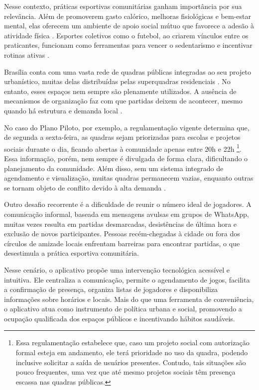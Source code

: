 Nesse contexto, práticas esportivas comunitárias ganham importância por sua relevância. Além de promoverem gasto calórico, melhoras fisiológicas e bem-estar mental, elas oferecem um ambiente de apoio social mútuo que favorece a adesão à atividade física \cite{ministerio2023}. Esportes coletivos como o futebol, ao criarem vínculos entre os praticantes, funcionam como ferramentas para vencer o sedentarismo e incentivar rotinas ativas \cite{ministerio2023,carbinatto2022}.

Brasília conta com uma vasta rede de quadras públicas integradas ao seu projeto urbanístico, muitas delas distribuídas pelas superquadras residenciais \cite{segov2023}. No entanto, esses espaços nem sempre são plenamente utilizados. A ausência de mecanismos de organização faz com que partidas deixem de acontecer, mesmo quando há estrutura e demanda local \cite{ipea2021}.

No caso do Plano Piloto, por exemplo, a regulamentação vigente determina que, de segunda a sexta-feira, as quadras sejam priorizadas para escolas e projetos sociais durante o dia, ficando abertas à comunidade apenas entre 20h e 22h \cite{peixoto2025}\footnote{Essa regulamentação estabelece que, caso um projeto social com autorização formal esteja em andamento, ele terá prioridade no uso da quadra, podendo inclusive solicitar a saída de usuários presentes. Contudo, tais situações são pouco frequentes, uma vez que até mesmo projetos sociais têm presença escassa nas quadras públicas.}. Essa informação, porém, nem sempre é divulgada de forma clara, dificultando o planejamento da comunidade. Além disso, sem um sistema integrado de agendamento e visualização, muitas quadras permanecem vazias, enquanto outras se tornam objeto de conflito devido à alta demanda \cite{agenciabrasilia2025}.

Outro desafio recorrente é a dificuldade de reunir o número ideal de jogadores. A comunicação informal, baseada em mensagens avulsas em grupos de WhatsApp, muitas vezes resulta em partidas desmarcadas, desistências de última hora e exclusão de novos participantes. Pessoas recém-chegadas à cidade ou fora dos círculos de amizade locais enfrentam barreiras para encontrar partidas, o que desestimula a prática esportiva comunitária.

Nesse cenário, o aplicativo propõe uma intervenção tecnológica acessível e intuitiva. Ele centraliza a comunicação, permite o agendamento de jogos, facilita a confirmação de presença, organiza listas de jogadores e disponibiliza informações sobre horários e locais. Mais do que uma ferramenta de conveniência, o aplicativo atua como instrumento de política urbana e social, promovendo a ocupação qualificada dos espaços públicos e incentivando hábitos saudáveis.

